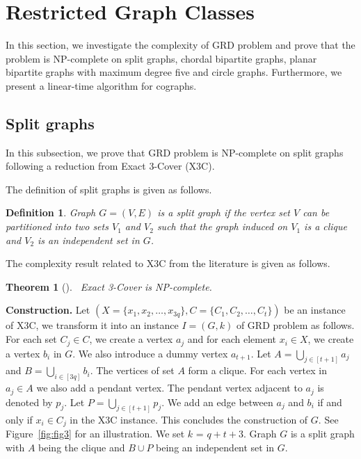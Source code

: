 \documentclass[preprint,12pt]{elsarticle}
\newcommand{\xthc}{{\sc Exact 3-Cover}}
\newtheorem{theorem}{Theorem}[section]
\newtheorem{definition}{Definition}{\bfseries}{\itshape}{\rmfamily}
\begin{document}
\section{Restricted Graph Classes}
In this section, we investigate the complexity of GRD problem and prove that the problem is NP-complete on split graphs, chordal bipartite graphs, planar bipartite graphs with maximum degree five and circle graphs. Furthermore, we present a linear-time algorithm for cographs.
\subsection{Split graphs}
In this subsection, we prove that GRD problem is NP-complete on split graphs following a reduction from \xthc{} (X3C).

 The definition of split graphs is given as follows.
\begin{definition}
    Graph $G = (V, E)$ is a split graph if the vertex set $V$ can be partitioned into two sets $V_1$ and $V_2$ such that the graph induced on $V_1$ is a clique and $V_2$ is an independent set in $G$.
\end{definition}
  The complexity result related to X3C from the literature is given as follows.
\begin{theorem}[\cite{johnson1979computers}]~\label{knownresult1}
    \xthc{} is NP-complete.
\end{theorem}
 \noindent \textbf{Construction. }Let $(X = \{x_1, x_2, \ldots, x_{3q}\}, C = \{C_1, C_2, \ldots, C_t\})$ be an instance of X3C, we transform it into an instance $I = (G, k)$ of GRD problem as follows. For each set $C_j\in C$, we create a vertex $a_j$ and for each element $x_i \in X$, we create a vertex $b_i$ in $G$. We also introduce a dummy vertex $a_{t+1}$. Let $A = \bigcup\limits_{j \in [t+1]}a_j$ and $B = \bigcup\limits_{i\in [3q]}b_i$. The vertices of set $A$ form a clique. For each vertex in $a_j \in A$ we also add a pendant vertex. The pendant vertex adjacent to $a_j$ is denoted by $p_j$. Let $P = \bigcup\limits_{j\in [t+1]}p_j$. We add an edge between $a_j$ and $b_i$ if and only if $x_i \in C_j$ in the X3C instance. This concludes the construction of $G$. See Figure~\ref{fig:fig3} for an illustration. We set $k$ = $q+t+3$. Graph $G$ is a split graph with $A$ being the clique and $B \cup P$ being an independent set in $G$.
\end{document}
